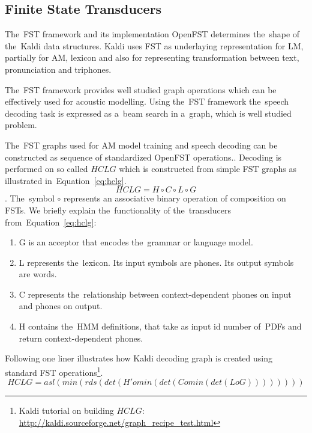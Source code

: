 \subsection{Finite State Transducers} 
\label{sec:fst}
The~\acl{FST} framework and its implementation OpenFST determines the~shape of the~Kaldi data structures.
Kaldi uses \ac{FST} as underlaying representation for \ac{LM}, partially for \ac{AM}, lexicon and also for representing transformation between text, pronunciation and triphones.

The~\ac{FST} framework provides well studied graph operations\cite{mohri2002weighted} which can be effectively used for acoustic modelling.
Using the~\ac{FST} framework the~speech decoding task is expressed as a~beam search in a~graph, which is well studied problem.

The~\ac{FST} graphs used for \ac{AM} model training and speech decoding can be constructed as sequence of standardized OpenFST operations.\cite{mohri2002weighted}.
Decoding is performed on so called  $HCLG$ which is constructed from simple \ac{FST} graphs as illustrated in~Equation~\ref{eq:hclg}. 
\begin{equation} \label{eq:hclg}
HCLG = H\circ C\circ L\circ G
\end{equation}.
The~symbol $\circ$ represents an associative binary operation of composition on \acp{FST}.
We briefly explain the~functionality of the~transducers from~Equation~\ref{eq:hclg}:
\begin{enumerate}
    \item G is an acceptor that encodes the~grammar or language model.
    \item L represents the~lexicon. Its input symbols are phones. Its output symbols are words.
    \item C represents the~relationship between context-dependent phones on input and phones on output.
    \item H contains the~\ac{HMM} definitions, that take as input id number of~\acp{PDF} and return context-dependent phones.
\end{enumerate}

Following one liner illustrates how Kaldi decoding graph is created using standard \ac{FST} operations\footnote{Kaldi tutorial on building $HCLG$: \url{http://kaldi.sourceforge.net/graph_recipe_test.html}}.\cite{mohri2002weighted}
\begin{equation}
   HCLG = asl(min(rds(det(H' o min(det(C o min(det(L o G)))))))) 
\end{equation}

